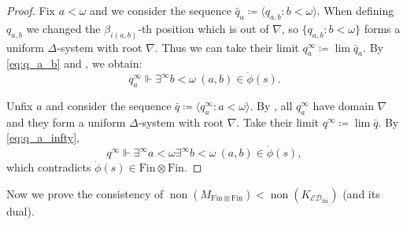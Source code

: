 \documentclass[a4paper,12pt]{amsart}
\theoremstyle{definition}
\numberwithin{thm}{section}
\numberwithin{equation}{section}
\renewcommand{\b}{\beta}
\DeclareMathOperator{\non}{non}
\newcommand{\forces}{\Vdash}
\newcommand{\edfin}{\mathcal{ED}_\mathrm{fin}}
\newcommand{\finfin}{\mathrm{Fin}\otimes\mathrm{Fin}}
\begin{document}
\begin{proof}
    	Fix $a<\omega$ and we consider the sequence $\bar{q}_a\coloneq\langle q_{a,b}:b<\omega\rangle$.
    	When defining $q_{a,b}$ we changed the $\b_{i(a,b)}$-th position which is out of $\nabla$, so $\{q_{a,b}:b<\omega\}$ forms a uniform $\Delta$-system with root $\nabla$.
    	Thus we can take their limit $q^\infty_a\coloneqq\lim\bar{q}_a$.
    	By \eqref{eq:q_a_b} and , we obtain:
    	\begin{equation}
    		\label{eq:q_a_infty}
    		q^\infty_a\forces \exists^\infty b<\omega ~(a,b)\in\dot{\phi}(s).
    	\end{equation}
    	
    	Unfix $a$ and consider the sequence $\bar{q}\coloneq\langle q^\infty_{a}:a<\omega\rangle$.
        By , all $q^\infty_{a}$ have domain $\nabla$ and they form a uniform $\Delta$-system with root $\nabla$. Take their limit $q^\infty\coloneqq\lim\bar{q}$.
    	By \eqref{eq:q_a_infty},
    	\begin{equation}
    		q^\infty\forces \exists^\infty a<\omega\exists^\infty b<\omega ~(a,b)\in\dot{\phi}(s),
    	\end{equation}
    	which contradicts $\dot{\phi}(s)\in\finfin$.
    \end{proof}

    Now we prove the consistency of $\non(M_{\finfin})<\non(K_{\edfin})$ (and its dual).
    
\end{document}
